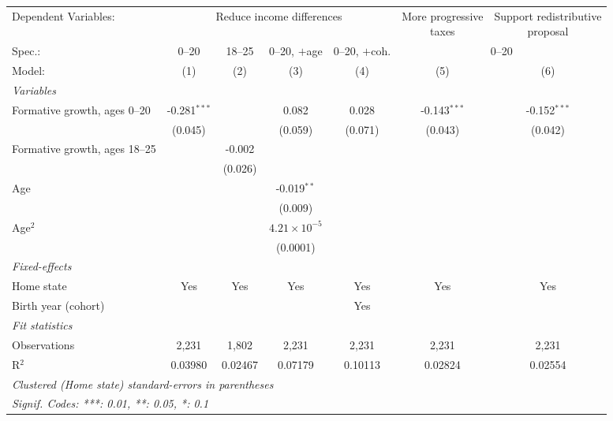 \begin{adjustbox}{max width=\linewidth}
   \begin{tabular}{lcccccc}
      \tabularnewline \midrule \midrule
      Dependent Variables: & \multicolumn{4}{c}{Reduce income differences} & \shortstack{More progressive\\ taxes} & \shortstack{Support redistributive\\ proposal}\\
      Spec.: & 0--20 & 18--25 & 0--20, $+$age & 0--20, $+$coh. & \multicolumn{2}{c}{0--20} \\ 
      Model:                        & (1)            & (2)     & (3)                   & (4)     & (5)            & (6)\\  
      \midrule
      \emph{Variables}\\
      Formative growth, ages 0--20  & -0.281$^{***}$ &         & 0.082                 & 0.028   & -0.143$^{***}$ & -0.152$^{***}$\\   
                                    & (0.045)        &         & (0.059)               & (0.071) & (0.043)        & (0.042)\\   
      Formative growth, ages 18--25 &                & -0.002  &                       &         &                &   \\   
                                    &                & (0.026) &                       &         &                &   \\   
      Age                           &                &         & -0.019$^{**}$         &         &                &   \\   
                                    &                &         & (0.009)               &         &                &   \\   
      Age$^2$                       &                &         & $4.21\times 10^{-5}$  &         &                &   \\   
                                    &                &         & (0.0001)              &         &                &   \\   
      \midrule
      \emph{Fixed-effects}\\
      Home state                    & Yes            & Yes     & Yes                   & Yes     & Yes            & Yes\\  
      Birth year (cohort)           &                &         &                       & Yes     &                & \\  
      \midrule
      \emph{Fit statistics}\\
      Observations                  & 2,231          & 1,802   & 2,231                 & 2,231   & 2,231          & 2,231\\  
      R$^2$                         & 0.03980        & 0.02467 & 0.07179               & 0.10113 & 0.02824        & 0.02554\\  
      \midrule \midrule
      \multicolumn{7}{l}{\emph{Clustered (Home state) standard-errors in parentheses}}\\
      \multicolumn{7}{l}{\emph{Signif. Codes: ***: 0.01, **: 0.05, *: 0.1}}\\
   \end{tabular}
      \end{adjustbox}
